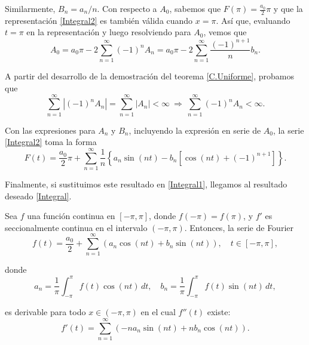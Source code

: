 \begin{demo}
Similarmente, $B_n = a_n/n$. Con respecto a $A_0$, sabemos que $F(\pi) = \frac{a_0}{2}\pi$ y que la representación \eqref{Integral2} es también válida cuando $x = \pi$. Así que, evaluando $t = \pi$ en la representación y luego resolviendo para $A_0$, vemos que
$$A_0 = a_0 \pi - 2 \sum_{n=1}^{\infty} (-1)^n A_n = a_0 \pi - 2 \sum_{n=1}^{\infty} \frac{(-1)^{n+1}}{n} b_n.$$

A partir del desarrollo de la demostración del teorema \ref{C.Uniforme}, probamos que 
$$\sum_{n=1}^{\infty} |(-1)^n A_n| = \sum_{n=1}^{\infty} |A_n| < \infty ~\Rightarrow~ \sum_{n=1}^{\infty} (-1)^n A_n < \infty.$$

Con las expresiones para $A_n$ y $B_n$, incluyendo la expresión en serie de $A_0$, la serie \eqref{Integral2} toma la forma 
$$F(t) = \frac{a_0}{2}\pi + \sum_{n=1}^{\infty} \frac{1}{n} \left\{ a_n \sin(nt) - b_n [\cos(nt) + (-1)^{n+1}] \right\}.$$

Finalmente, si sustituimos este resultado en  \eqref{Integral1}, llegamos al resultado deseado \eqref{Integral}.
\end{demo}

\begin{teorema}[Derivación]
Sea $f$ una función continua en $[-\pi,\pi]$, donde $f(-\pi) = f(\pi)$, y $f'$ es seccionalmente continua en el intervalo $(-\pi,\pi)$. Entonces, la serie de Fourier
\begin{equation}
    f(t) = \frac{a_0}{2} + \sum_{n=1}^{\infty} (a_n \cos(nt) + b_n \sin (nt) ), \quad t \in [-\pi,\pi], \label{Derivada1}
\end{equation}

donde 
$$a_n = \frac{1}{\pi} \int_{-\pi}^{\pi} f(t) \cos(nt) \,dt, \quad b_n = \frac{1}{\pi} \int_{-\pi}^{\pi} f(t) \sin(nt) \,dt,$$

es derivable para todo $x \in (-\pi,\pi)$ en el cual $f''(t)$ existe:
\begin{equation}
    f'(t) = \sum_{n=1}^{\infty} ( - n a_n \sin(nt) + nb_n \cos(nt)).\label{Derivada2}
\end{equation}
\end{teorema}

